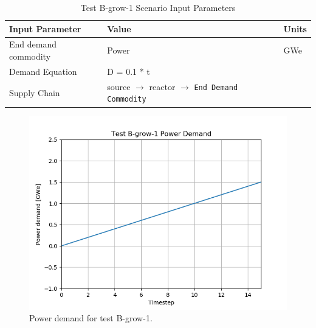 \documentclass[11pt,letterpaper]{article}
\begin{document}
\begin{table}[H]
	\centering
	\caption{Test B-grow-1 Scenario Input Parameters }
	\label{tab:test_B-grow-1}
	\begin{tabular}{|l|l|l|}
		\hline
		\textbf{Input Parameter} & \textbf{Value} & \textbf{Units} \\
		\hline
		End demand commodity & Power & GWe \\
		Demand Equation & D = 0.1 * t & \\
		Supply Chain & source $\rightarrow$ reactor $\rightarrow$ \texttt{End Demand Commodity} &  \\
		\hline
	\end{tabular}
\end{table}

\begin{figure}[H]
	\begin{center}
		\includegraphics[scale=0.7]{./images/B-grow-1.png}
	\end{center}
	\caption{Power demand for test B-grow-1.}
	\label{fig:B-grow-1}
\end{figure}
\end{document}
